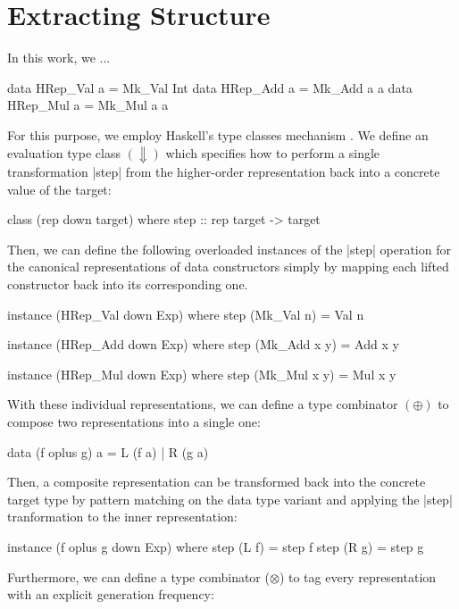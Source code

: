 \section{Extracting Structure} \label{sec:hrep}

In this work, we ...

\begin{code}
data HRep_Val  a = Mk_Val Int
data HRep_Add  a = Mk_Add a a
data HRep_Mul  a = Mk_Mul a a
\end{code}

For this purpose, we employ Haskell's type classes mechanism \tocite{}.
%
We define an evaluation type class $(\Downarrow)$ which specifies how to perform
a single transformation |step| from the higher-order representation back into a
concrete value of the target:

\begin{code}
class (rep down target) where
  step :: rep target -> target
\end{code}

Then, we can define the following overloaded instances of the |step| operation
for the canonical representations of data constructors simply by mapping each
lifted constructor back into its corresponding one.

\begin{code}
instance (HRep_Val down Exp) where
  step (Mk_Val n) = Val n

instance (HRep_Add down Exp) where
  step (Mk_Add x y) = Add x y

instance (HRep_Mul down Exp) where
  step (Mk_Mul x y) = Mul x y
\end{code}

With these individual representations, we can define a type combinator
$(\oplus)$ to compose two representations into a single one:

\begin{code}
data (f oplus g) a = L (f a) | R (g a)
\end{code}

Then, a composite representation can be transformed back into the concrete
target type by pattern matching on the data type variant and applying the |step|
tranformation to the inner representation:

\begin{code}
instance (f oplus g down Exp) where
  step (L f) = step f
  step (R g) = step g
\end{code}

Furthermore, we can define a type combinator ($\otimes$) to tag every
representation with an explicit generation frequency:

